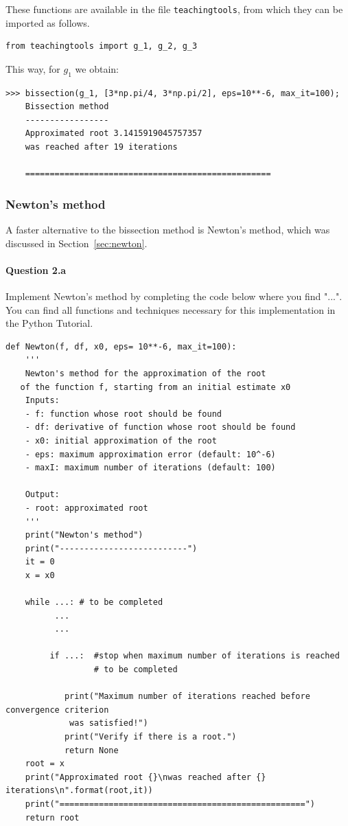 These functions are available in the file \lstinline|teachingtools|, from which they can be imported as follows.
\begin{lstlisting}
from teachingtools import g_1, g_2, g_3
\end{lstlisting}

This way, for $g_1$ we obtain:

\begin{lstlisting}
>>> bissection(g_1, [3*np.pi/4, 3*np.pi/2], eps=10**-6, max_it=100);
	Bissection method
	-----------------
	Approximated root 3.1415919045757357
	was reached after 19 iterations
	
	==================================================
\end{lstlisting}


\subsubsection{Newton's method}\label{pc_NR}
A faster alternative to the bissection method is Newton's method, which was discussed in Section~\ref{sec:newton}.

\paragraph{Question 2.a}
Implement Newton's method by completing the code below where you find "...". You can find all functions and techniques necessary for this implementation in the Python Tutorial.


\begin{lstlisting}
def Newton(f, df, x0, eps= 10**-6, max_it=100):
    '''
    Newton's method for the approximation of the root
   of the function f, starting from an initial estimate x0 
    Inputs: 
    - f: function whose root should be found
    - df: derivative of function whose root should be found
    - x0: initial approximation of the root
    - eps: maximum approximation error (default: 10^-6)
    - maxI: maximum number of iterations (default: 100)
    
    Output:
    - root: approximated root
    '''
    print("Newton's method")
    print("--------------------------")
    it = 0
    x = x0
    
    while ...: # to be completed
          ...
          ...
    
         if ...:  #stop when maximum number of iterations is reached
                  # to be completed
        
            print("Maximum number of iterations reached before convergence criterion
             was satisfied!")
            print("Verify if there is a root.")
            return None
    root = x
    print("Approximated root {}\nwas reached after {} iterations\n".format(root,it))
    print("==================================================")
    return root
\end{lstlisting}


